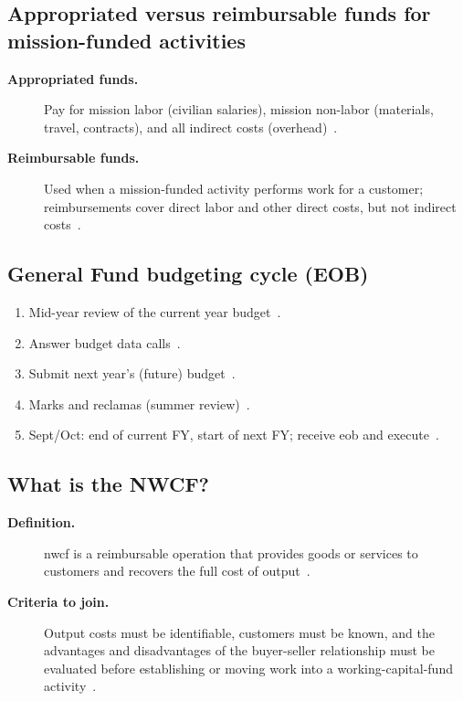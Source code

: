 \documentclass[../main.tex]{subfiles}
\begin{document}
\subsection{Appropriated versus reimbursable funds for mission-funded activities}
\begin{description}
  \item[\textbf{Appropriated funds.}] Pay for mission labor (civilian salaries), mission non-labor (materials, travel, contracts), and all indirect costs (overhead)~\autocite{edo-3-1-5-field-activity-fm-2025}.
  \item[\textbf{Reimbursable funds.}] Used when a mission-funded activity performs work for a customer; reimbursements cover direct labor and other direct costs, but not indirect costs~\autocite{edo-3-1-5-field-activity-fm-2025}.
\end{description}

\subsection{General Fund budgeting cycle (EOB)}
\begin{enumerate}
  \item Mid-year review of the current year budget~\autocite{edo-3-1-5-field-activity-fm-2025}.
  \item Answer budget data calls~\autocite{edo-3-1-5-field-activity-fm-2025}.
  \item Submit next year's (future) budget~\autocite{edo-3-1-5-field-activity-fm-2025}.
  \item Marks and reclamas (summer review)~\autocite{edo-3-1-5-field-activity-fm-2025}.
  \item Sept/Oct: end of current FY, start of next FY; receive \ac{eob} and execute~\autocite{edo-3-1-5-field-activity-fm-2025}.
\end{enumerate}

\subsection{What is the NWCF?}
\begin{description}
  \item[\textbf{Definition.}] \ac{nwcf} is a reimbursable operation that provides goods or services to customers and recovers the full cost of output~\autocite{edo-3-1-5-field-activity-fm-2025,USC-2208-NWCF,DoDFMR-Vol11B-Ch1}.
  \item[\textbf{Criteria to join.}] Output costs must be identifiable, customers must be known, and the advantages and disadvantages of the buyer-seller relationship must be evaluated before establishing or moving work into a working-capital-fund activity~\autocite{edo-3-1-5-field-activity-fm-2025,DoDFMR-Vol11B-Ch2}.
\end{description}
\end{document}
